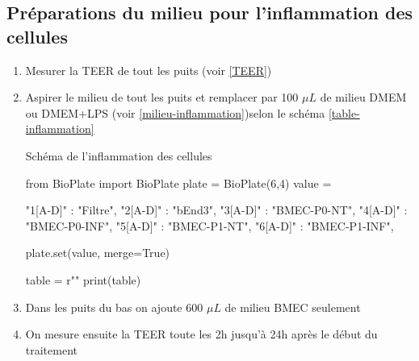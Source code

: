 \subsection{Préparations du milieu pour l'inflammation des cellules}

\begin{enumerate}
\item Mesurer la TEER de tout les puits (voir \ref{TEER})
\item Aspirer le milieu de tout les puits et remplacer par 100 $\mu L$ de milieu DMEM ou DMEM+LPS (voir \ref{milieu-inflammation})selon le schéma \ref{table-inflammation}

\begin{table}[h]
\caption{Schéma de l'inflammation des cellules}
\begin{pycode}

from BioPlate import BioPlate
plate = BioPlate(6,4)
value = {
	"1[A-D]" : "Filtre",
	"2[A-D]" : "bEnd3",
	"3[A-D]" : "BMEC-P0-NT",
	"4[A-D]" : "BMEC-P0-INF",
	"5[A-D]" : "BMEC-P1-NT",
	"6[A-D]" : "BMEC-P1-INF",
	
}
plate.set(value, merge=True)

table = r""
print(table)
\end{pycode}
\label{table-inflammation}
\end{table}
\item Dans les puits du bas on ajoute 600 $\mu L$ de milieu BMEC seulement
\item On mesure ensuite la TEER toute les 2h jusqu'à 24h après le début du traitement
\end{enumerate}